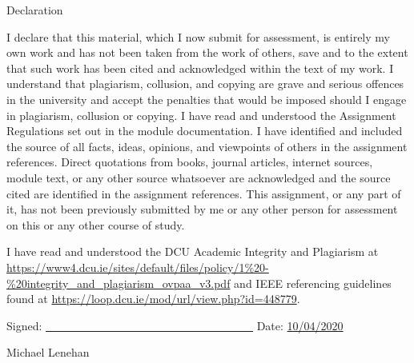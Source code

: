 \thispagestyle{plain}
\begingroup
\renewcommand{\cleardoublepage}{}
\renewcommand{\clearpage}{}

\LARGE{Declaration}

\endgroup

\vskip 1cm

I declare that this material, which I now submit for assessment, is entirely my
own work and has not been taken from the work of others, save and to the extent
that such work has been cited and acknowledged within the text of my work. I
understand that plagiarism, collusion, and copying are grave and serious
offences in the university and accept the penalties that would be imposed should
I engage in plagiarism, collusion or copying. I have read and understood the
Assignment Regulations set out in the module documentation. I have identified
and included the source of all facts, ideas, opinions, and viewpoints of others
in the assignment references. Direct quotations from books, journal articles,
internet sources, module text, or any other source whatsoever are acknowledged
and the source cited are identified in the assignment references. This
assignment, or any part of it, has not been previously submitted by me or any
other person for assessment on this or any other course of study.

I have read and understood the DCU Academic Integrity and Plagiarism at
\url{https://www4.dcu.ie/sites/default/files/policy/1%20-%20integrity\_and\_plagiarism\_ovpaa_v3.pdf}
and IEEE referencing guidelines found at
\url{https://loop.dcu.ie/mod/url/view.php?id=448779}.

\vskip 1cm
Signed: \underline{\ \ \ \ \ \ \ \ \ \ \ \ \ \ \ \ \ \ \ \ \ \ \ \ \ \ \ \ \ \ \
\ \ \ \ \ \ } \hspace{20mm}Date: \underline{10/04/2020}

\hspace*{0mm}\phantom{Signed:}Michael Lenehan

\pagebreak
